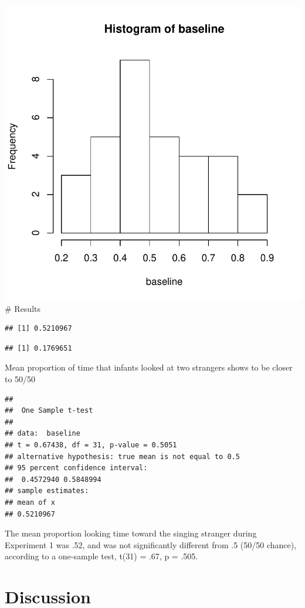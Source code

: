 \documentclass[man]{apa6}
\begin{document}
\includegraphics{Midterm_files/figure-latex/myfig-1.pdf} \# Results

\begin{verbatim}
## [1] 0.5210967
\end{verbatim}

\begin{verbatim}
## [1] 0.1769651
\end{verbatim}

Mean proportion of time that infants looked at two strangers shows to be
closer to 50/50

\begin{verbatim}
## 
##  One Sample t-test
## 
## data:  baseline
## t = 0.67438, df = 31, p-value = 0.5051
## alternative hypothesis: true mean is not equal to 0.5
## 95 percent confidence interval:
##  0.4572940 0.5848994
## sample estimates:
## mean of x 
## 0.5210967
\end{verbatim}

The mean proportion looking time toward the singing stranger during
Experiment 1 was .52, and was not significantly different from .5 (50/50
chance), according to a one-sample test, t(31) = .67, p = .505.

\section{Discussion}\label{discussion}
\end{document}
